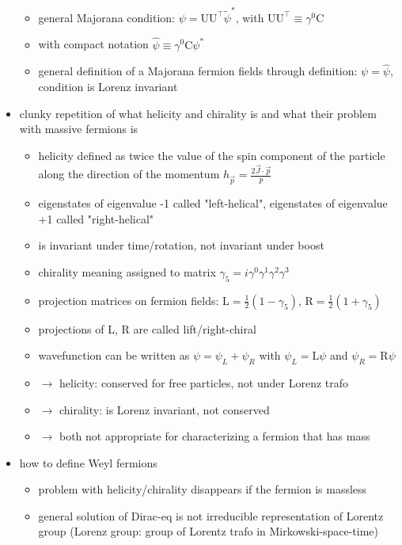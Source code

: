 \documentclass[encoding=utf8,british]{tumphthesis}
\begin{document}
\begin{itemize}
\begin{itemize}
\item general Majorana condition: \(\psi = \mathrm{U}\mathrm{U}^\top\tilde{\psi}^*\), with \(\mathrm{U}\mathrm{U}^\top \equiv \gamma^0 \mathrm{C}\)
\item with compact notation \(\widehat{\psi} \equiv \gamma^0 \mathrm{C} \psi^*\)
\item general definition of a Majorana fermion fields through definition: \(\psi = \widehat{\psi}\), condition is Lorenz invariant
\end{itemize}
\item clunky repetition of what helicity and chirality is and what their problem with massive fermions is
\begin{itemize}
\item helicity defined as twice the value of the spin component of the particle along the direction of the momentum \(h_{\vec{p}} = \frac{2 \vec{J} \cdot \vec{p}}{p}\)
\item eigenstates of eigenvalue -1 called "left-helical", eigenstates of eigenvalue +1 called "right-helical"
\item is invariant under time/rotation, not invariant under boost
\item chirality meaning assigned to matrix \(\gamma_5 = i\gamma^0\gamma^1\gamma^2\gamma^3\)
\item projection matrices on fermion fields: \( \mathrm{L} = \frac{1}{2} \left( 1- \gamma_5\right ) \), \( \mathrm{R} = \frac{1}{2} \left( 1 + \gamma_5\right ) \)
\item projections of L, R are called lift/right-chiral
\item wavefunction can be written as \(\psi = \psi_L + \psi_R\) with \(\psi_L = \mathrm{L}\psi\) and \(\psi_R = \mathrm{R}\psi\)
\item \(\rightarrow\) helicity: conserved for free particles, not under Lorenz trafo
\item \(\rightarrow\) chirality: is Lorenz invariant, not conserved
\item \(\rightarrow\) both not appropriate for characterizing a fermion that has mass
\end{itemize}
\item how to define Weyl fermions
\begin{itemize}
\item problem with helicity/chirality disappears if the fermion is massless
\item general solution of Dirac-eq is not irreducible representation of Lorentz group (Lorenz group: group of Lorentz trafo in Mirkowski-space-time)

\end{itemize}
\end{itemize}
\end{document}

